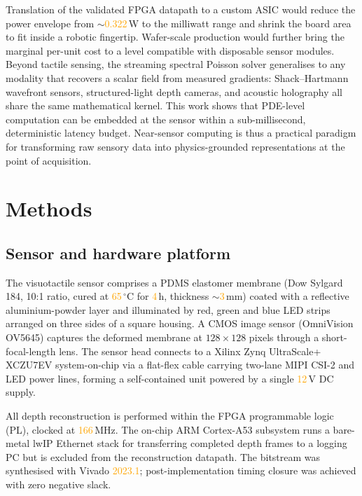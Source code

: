 \documentclass[10pt,a4paper]{article}
\newcommand{\placeholder}[1]{\textcolor{orange}{#1}}
\newcommand{\pwrFPGA}{\placeholder{0.322}}                %
\newcommand{\clockMHz}{\placeholder{166}}
\begin{document}
Translation of the validated FPGA datapath to a custom ASIC would reduce the power envelope from ${\sim}$\pwrFPGA\,W to the milliwatt range and shrink the board area to fit inside a robotic fingertip. Wafer-scale production would further bring the marginal per-unit cost to a level compatible with disposable sensor modules. Beyond tactile sensing, the streaming spectral Poisson solver generalises to any modality that recovers a scalar field from measured gradients: Shack--Hartmann wavefront sensors, structured-light depth cameras, and acoustic holography all share the same mathematical kernel. This work shows that PDE-level computation can be embedded at the sensor within a sub-millisecond, deterministic latency budget. Near-sensor computing is thus a practical paradigm for transforming raw sensory data into physics-grounded representations at the point of acquisition.


\section*{Methods}

\subsection*{Sensor and hardware platform}

The visuotactile sensor comprises a PDMS elastomer membrane (Dow Sylgard 184, 10:1 ratio, cured at \placeholder{65}\,$^\circ$C for \placeholder{4}\,h, thickness $\sim$\placeholder{3}\,mm) coated with a reflective aluminium-powder layer and illuminated by red, green and blue LED strips arranged on three sides of a square housing. A CMOS image sensor (OmniVision OV5645) captures the deformed membrane at $128 \times 128$ pixels through a short-focal-length lens. The sensor head connects to a Xilinx Zynq UltraScale+ XCZU7EV system-on-chip via a flat-flex cable carrying two-lane MIPI CSI-2 and LED power lines, forming a self-contained unit powered by a single \placeholder{12}\,V DC supply.

All depth reconstruction is performed within the FPGA programmable logic (PL), clocked at \clockMHz\,MHz. The on-chip ARM Cortex-A53 subsystem runs a bare-metal lwIP Ethernet stack for transferring completed depth frames to a logging PC but is excluded from the reconstruction datapath. The bitstream was synthesised with Vivado \placeholder{2023.1}; post-implementation timing closure was achieved with zero negative slack.
\end{document}
